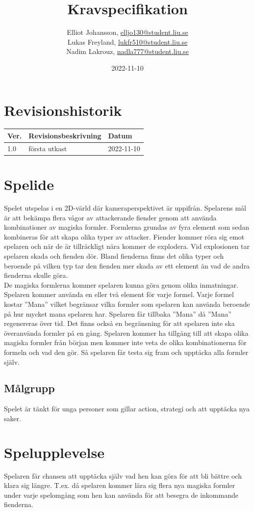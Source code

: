 \documentclass[12pt]{TDP005mall}
\author{Elliot Johansson, \url{elljo130@student.liu.se}\\
  Lukas Freyland, \url{lukfr510@student.liu.se}\\
  Nadim Lakrouz, \url{nadla777@student.liu.se}}
\title{Kravspecifikation}
\date{2022-11-10}
\begin{document}
\projectpage

\tableofcontents
\clearpage

\section{Revisionshistorik}
\begin{table}[!h]
\begin{tabularx}{\linewidth}{|l|X|l|}
\hline
Ver. & Revisionsbeskrivning & Datum \\\hline
1.0 & första utkast & 2022-11-10 \\\hline
\end{tabularx}
\end{table}


\section{Spelide}

Spelet utspelas i en 2D-värld där kameraperspektivet är uppifrån. Spelarens mål är att bekämpa flera vågor av attackerande fiender genom att använda kombinationer av magiska formler. Formlerna grundas av fyra element som sedan kombineras för att skapa olika typer av attacker. Fiender kommer röra sig emot spelaren och när de är tillräckligt nära kommer de explodera. Vid explosionen tar spelaren skada och fienden dör. Bland fienderna finns det olika typer och beroende på vilken typ tar den fienden mer skada av ett element än vad de andra fienderna skulle göra.\\
De magiska formlerna kommer spelaren kunna göra genom olika inmatningar. Spelaren kommer använda en eller två element för varje formel. Varje formel kostar ''Mana'' vilket begränsar vilka formler som spelaren kan använda beroende på hur mycket mana spelaren har. Spelaren får tillbaka ''Mana'' då ''Mana'' regenereras över tid. Det finns också en begränsning för att spelaren inte ska överanvända formler på en gång.
Spelaren kommer ha tillgång till att skapa olika magiska formler från början men kommer inte veta de olika kombinationerna för formeln och vad den gör. Så spelaren får testa sig fram och upptäcka alla formler själv. 


\subsection{Målgrupp}
Spelet är tänkt för unga personer som gillar action, strategi och att upptäcka nya saker.

\section{Spelupplevelse}
Spelaren får chansen att upptäcka själv vad hen kan göra för att bli bättre och klara sig längre. T.ex. då spelaren kommer lära sig flera nya magiska formler under varje spelomgång som hen kan använda för att besegra de inkommande fienderna. 
\end{document}
